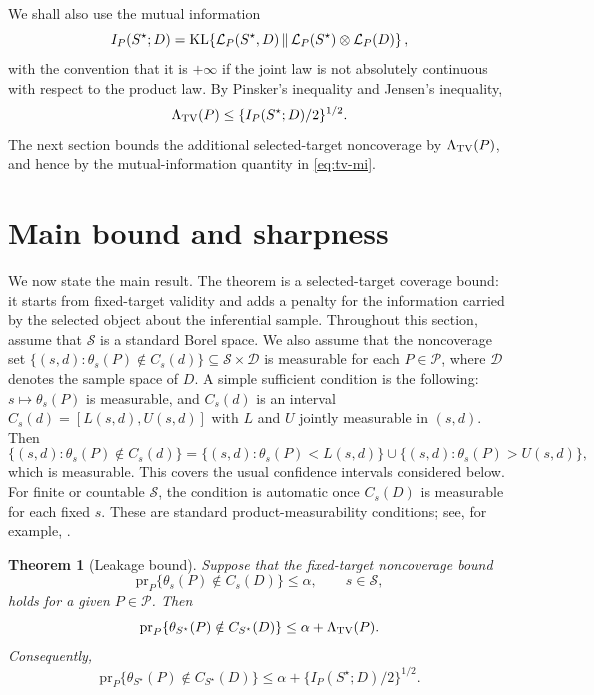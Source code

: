 \documentclass[11pt]{article}
\newtheorem{theorem}{Theorem}
\newcommand{\calS}{\mathcal S}
\newcommand{\calP}{\mathcal P}
\begin{document}
We shall also use the mutual information
\[
I_P(S^\star;D)
=
{\rm KL}\!\left\{
\mathcal L_P(S^\star,D)
\,\middle\|\,
\mathcal L_P(S^\star)\otimes\mathcal L_P(D)
\right\},
\]
with the convention that it is \(+\infty\) if the joint law is not absolutely continuous with respect to the product law. By Pinsker's inequality and Jensen's inequality,
\begin{equation}
	\label{eq:tv-mi}
	\Lambda_{\rm TV}(P)
	\leq
	\{I_P(S^\star;D)/2\}^{1/2}.
\end{equation}
The next section bounds the additional selected-target noncoverage by
\(\Lambda_{\rm TV}(P)\), and hence by the mutual-information quantity in
\eqref{eq:tv-mi}.	

\section{Main bound and sharpness}
\label{sec:leakage}

We now state the main result. The theorem is a selected-target coverage bound: it starts from fixed-target validity and adds a penalty for the information carried by the selected object about the inferential sample. 
Throughout this section, assume that \(\calS\) is a standard Borel space. We also assume that the noncoverage set $\{(s,d):\theta_s(P)\notin C_s(d)\} \subseteq \calS\times\mathcal D$
is measurable for each \(P\in\calP\), where \(\mathcal D\) denotes the sample space of \(D\). A simple sufficient condition is the following: \(s\mapsto \theta_s(P)\) is measurable, and \(C_s(d)\) is an interval
$ C_s(d)=[L(s,d),U(s,d)]$ with \(L\) and \(U\) jointly measurable in \((s,d)\). Then
\[
\{(s,d):\theta_s(P)\notin C_s(d)\}
=
\{(s,d):\theta_s(P)<L(s,d)\}
\cup
\{(s,d):\theta_s(P)>U(s,d)\},
\]
which is measurable. This covers the usual confidence intervals considered below. For finite or countable \(\calS\), the condition is automatic once \(C_s(D)\) is measurable for each fixed \(s\). These are standard product-measurability conditions; see, for example,
\citet{kallenberg2002foundations}.

\begin{theorem}[Leakage bound]
	\label{thm:tv-leakage}
	Suppose that the fixed-target noncoverage bound
	\[
	\mathrm{pr}_P\{\theta_s(P)\notin C_s(D)\}\leq \alpha,
	\qquad s\in\calS,
	\]
	holds for a given \(P\in\calP\). Then
	\[
	\mathrm{pr}_P\{\theta_{S^\star}(P)\notin C_{S^\star}(D)\}
	\leq
	\alpha+\Lambda_{\rm TV}(P).
	\]
	Consequently,
	\[
	\mathrm{pr}_P\{\theta_{S^\star}(P)\notin C_{S^\star}(D)\}
	\leq
	\alpha+\{I_P(S^\star;D)/2\}^{1/2}.
	\]
\end{theorem}
\end{document}
